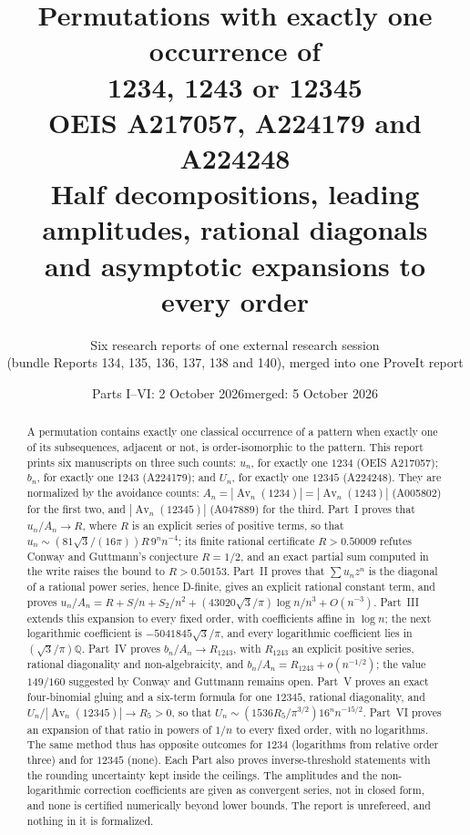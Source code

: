 \documentclass[11pt,letterpaper]{article}
\title{\textbf{Permutations with exactly one occurrence of\\ 1234, 1243 or 12345}\\[4pt]\large OEIS A217057, A224179 and A224248\\[7pt]
\large Half decompositions, leading amplitudes, rational diagonals\\ and asymptotic expansions to every order}
\author{Six research reports of one external research session\\(bundle Reports 134, 135, 136, 137, 138 and 140), merged into one ProveIt report}
\date{Parts I--VI: 2 October 2026\quad merged: 5 October 2026}
\theoremstyle{remark}\newtheorem{remark}[theorem]{Remark}
\numberwithin{equation}{section}
\newcommand{\Av}{\operatorname{Av}}
\begin{document}
\hypersetup{pageanchor=false}
\maketitle
\begin{abstract}
A permutation contains exactly one classical occurrence of a pattern when exactly one of its subsequences, adjacent or not, is order-isomorphic to the pattern. This report prints six manuscripts on three such counts: $u_n$, for exactly one $1234$ (OEIS A217057); $b_n$, for exactly one $1243$ (A224179); and $U_n$, for exactly one $12345$ (A224248). They are normalized by the avoidance counts: $A_n=|\Av_n(1234)|=|\Av_n(1243)|$ (A005802) for the first two, and $|\Av_n(12345)|$ (A047889) for the third. Part~I proves that $u_n/A_n\to R$, where $R$ is an explicit series of positive terms, so that $u_n\sim(81\sqrt3/(16\pi))R\,9^nn^{-4}$; its finite rational certificate $R>0.50009$ refutes Conway and Guttmann's conjecture $R=1/2$, and an exact partial sum computed in the write raises the bound to $R>0.50153$. Part~II proves that $\sum u_nz^n$ is the diagonal of a rational power series, hence D-finite, gives an explicit rational constant term, and proves $u_n/A_n=R+S/n+S_2/n^2+(43020\sqrt3/\pi)\log n/n^3+O(n^{-3})$. Part~III extends this expansion to every fixed order, with coefficients affine in $\log n$; the next logarithmic coefficient is $-5041845\sqrt3/\pi$, and every logarithmic coefficient lies in $(\sqrt3/\pi)\mathbb Q$. Part~IV proves $b_n/A_n\to R_{1243}$, with $R_{1243}$ an explicit positive series, rational diagonality and non-algebraicity, and $b_n/A_n=R_{1243}+o(n^{-1/2})$; the value $149/160$ suggested by Conway and Guttmann remains open. Part~V proves an exact four-binomial gluing and a six-term formula for one $12345$, rational diagonality, and $U_n/|\Av_n(12345)|\to R_5>0$, so that $U_n\sim(1536R_5/\pi^{3/2})16^nn^{-15/2}$. Part~VI proves an expansion of that ratio in powers of $1/n$ to every fixed order, with no logarithms. The same method thus has opposite outcomes for $1234$ (logarithms from relative order three) and for $12345$ (none). Each Part also proves inverse-threshold statements with the rounding uncertainty kept inside the ceilings. The amplitudes and the non-logarithmic correction coefficients are given as convergent series, not in closed form, and none is certified numerically beyond lower bounds. The report is unrefereed, and nothing in it is formalized.
\end{abstract}
\hypersetup{pageanchor=true}
\setcounter{tocdepth}{1}
{\small\setlength{\parskip}{0pt}\tableofcontents}
\newpage
\end{document}
